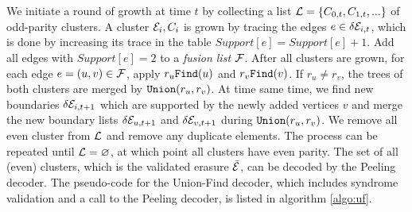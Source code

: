 We initiate a round of growth at time $t$ by collecting a list $\mathcal{L} = \{C_{0,t}, C_{1,t}, ...\}$ of odd-parity clusters. A cluster $\mathcal{E}_i, C_i$ is grown by tracing the edges $e \in \delta \mathcal{E}_{i,t}$, which is done by increasing its trace in the table $Support[e] = Support[e] +1$. Add all edges with $Support[e]=2$ to a \emph{fusion list} $\mathcal{F}$. After all clusters are grown, for each edge $e=(u,v) \in \mathcal{F}$, apply $r_u\texttt{Find}(u)$ and $r_v\texttt{Find}(v)$. If $r_u\neq r_v$, the trees of both clusters are merged by $\texttt{Union}(r_u,r_v)$. At time same time, we find new boundaries $\delta \mathcal{E}_{i,t+1}$ which are supported by the newly added vertices $v$ and merge the new boundary lists $\delta \mathcal{E}_{u,t+1}$ and $\delta \mathcal{E}_{v,t+1}$ during $\texttt{Union}(r_u,r_v)$. We remove all even cluster from $\mathcal{L}$ and remove any duplicate elements. The process can be repeated until $\mathcal{L}=\varnothing$, at which point all clusters have even parity. The set of all (even) clusters, which is the validated erasure $\bar{\mathcal{E}}$, can be decoded by the Peeling decoder. The pseudo-code for the Union-Find decoder, which includes syndrome validation and a call to the Peeling decoder, is listed in algorithm \ref{algo:uf}. 




